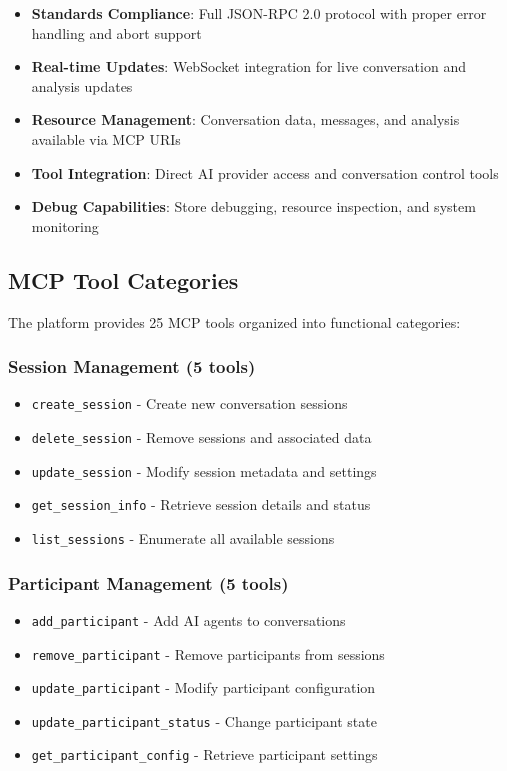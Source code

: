 \documentclass[11pt,letterpaper]{article}
\begin{document}
\begin{itemize}
    \item \textbf{Standards Compliance}: Full JSON-RPC 2.0 protocol with proper error handling and abort support
    \item \textbf{Real-time Updates}: WebSocket integration for live conversation and analysis updates
    \item \textbf{Resource Management}: Conversation data, messages, and analysis available via MCP URIs
    \item \textbf{Tool Integration}: Direct AI provider access and conversation control tools
    \item \textbf{Debug Capabilities}: Store debugging, resource inspection, and system monitoring
\end{itemize}

\subsection{MCP Tool Categories}

The platform provides 25 MCP tools organized into functional categories:

\subsubsection{Session Management (5 tools)}
\begin{itemize}
    \item \texttt{create\_session} - Create new conversation sessions
    \item \texttt{delete\_session} - Remove sessions and associated data
    \item \texttt{update\_session} - Modify session metadata and settings
    \item \texttt{get\_session\_info} - Retrieve session details and status
    \item \texttt{list\_sessions} - Enumerate all available sessions
\end{itemize}

\subsubsection{Participant Management (5 tools)}
\begin{itemize}
    \item \texttt{add\_participant} - Add AI agents to conversations
    \item \texttt{remove\_participant} - Remove participants from sessions
    \item \texttt{update\_participant} - Modify participant configuration
    \item \texttt{update\_participant\_status} - Change participant state
    \item \texttt{get\_participant\_config} - Retrieve participant settings
\end{itemize}
\end{document}
